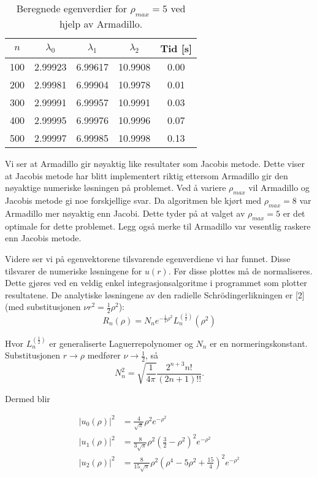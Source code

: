 \documentclass[norsk, 12pt]{article}
\newcommand{\f}{\frac}
\begin{document}
\begin{table}[h!]
\centering
 \begin{tabular}{|c|c|c|c|c|}\hline
  $n$ & $\lambda_0$ & $\lambda_1$ & $\lambda_2$ & Tid [s] \\ \hline
  100 & 2.99923 & 6.99617 & 10.9908 & 0.00  \\
  200 & 2.99981 & 6.99904 & 10.9978 & 0.01 \\
  300 & 2.99991 & 6.99957 & 10.9991 & 0.03  \\
  400 & 2.99995 & 6.99976 & 10.9996 & 0.07  \\
  500 & 2.99997 & 6.99985 & 10.9998 & 0.13  \\ \hline 
 \end{tabular}
\caption{Beregnede egenverdier for $\rho_{max} = 5$ ved hjelp av Armadillo.}
\end{table}

Vi ser at Armadillo gir nøyaktig like resultater som Jacobis metode. Dette viser at Jacobis metode har blitt implementert riktig
ettersom Armadillo gir den nøyaktige numeriske løsningen på problemet. Ved å variere $\rho_{max}$ vil Armadillo og Jacobis metode
gi noe forskjellige svar. Da algoritmen ble kjørt med $\rho_{max}=8$ var Armadillo mer nøyaktig enn Jacobi. Dette tyder på at valget
av $\rho_{max}=5$ er det optimale for dette problemet. Legg også merke til Armadillo var vesentlig raskere enn Jacobis metode.

Videre ser vi på egenvektorene tilsvarende egenverdiene vi har funnet. Disse tilsvarer de numeriske løsningene for $u(r)$. Før disse 
plottes må de normaliseres. Dette gjøres ved en veldig enkel integrasjonsalgoritme i programmet som plotter resultatene.
De analytiske løsningene av den radielle Schrödingerlikningen er [2](med substitusjonen $\nu r^2=\f{1}{2}\rho^2$):
$$R_n(\rho) = N_n e^{-\f{1}{2}\rho^2}L_n^{\left(\f{1}{2}\right)}(\rho^2)$$

Hvor $L_n^{\left(\f{1}{2}\right)}$ er generaliserte Laguerrepolynomer og $N_n$ er en normeringskonstant.
Substitusjonen $r\rightarrow \rho$ medfører $\nu\rightarrow \f{1}{2}$, så
$$N_n^2 = \sqrt{\f{1}{4\pi}}\f{2^{n+3}n!}{(2n+1)!!}.$$

Dermed blir

\begin{align*}
 |u_0(\rho)|^2 &= \f{4}{\sqrt{\pi}}\rho^2e^{-\rho^2} \\
 |u_1(\rho)|^2 &= \f{8}{3\sqrt{\pi}}\rho^2\left(\f{3}{2}-\rho^2\right)^2e^{-\rho^2} \\
 |u_2(\rho)|^2 &= \f{8}{15\sqrt{\pi}}\rho^2\left(\rho^4-5\rho^2+\f{15}{4}\right)^2e^{-\rho^2} 
\end{align*}
\end{document}
